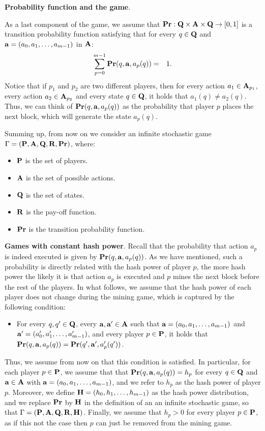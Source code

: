\medskip
\noindent
\textbf{Probability function and the game}.

As a last component of the game, we assume that $\mathbf{Pr} : \mathbf{Q} \times \mathbf{A} \times \mathbf{Q} \to [0,1]$ is a transition probability function satisfying that for every $q \in \mathbf{Q}$ and $\mathbf{a} = (a_0, a_1, \ldots, a_{m-1})$ in $\mathbf{A}$:
\begin{eqnarray*}\label{eq-prop}
\sum_{p=0}^{m-1} \mathbf{Pr}(q, \mathbf{a}, a_p(q)) & = & 1.
\end{eqnarray*}
Notice that if $p_1$ and $p_2$ are two different players, then for every action $a_1 \in \mathbf{A}_{p_1}$, every action $a_2 \in \mathbf{A}_{p_2}$ and every state $q \in \mathbf{Q}$, it holds that $a_1(q) \neq a_2(q)$. Thus, we can think of $\mathbf{Pr}(q, \mathbf{a}, a_p(q))$ as the probability that player $p$ places the next block, which will generate the state $a_p(q)$. 

Summing up, from now on we consider an infinite stochastic game $\Gamma = (\mathbf{P},\mathbf{A},\mathbf{Q},\mathbf{R},\mathbf{Pr})$, where:
\begin{itemize}
	\item $\mathbf{P}$ is the set of players.
	\item $\mathbf{A}$ is the set of possible actions.
	\item $\mathbf{Q}$ is the set of states.
	\item $\mathbf{R}$ is the pay-off function.
	\item $\mathbf{Pr}$ is the transition probability function.
\end{itemize} 

\medskip
\noindent
\textbf{Games with constant hash power}.
Recall that the probability that action $a_p$ is indeed executed is given by $\mathbf{Pr}(q, \mathbf{a}, a_p(q))$. As we have mentioned, such a probability is directly related with the hash power of player $p$, the more hash power the likely it is that action $a_p$ is executed and $p$ mines the next block before the rest of the players. In what follows, we assume that the hash power of each player does not change during the mining game, which is captured by the following condition:
\begin{itemize}
\item For every $q, q' \in \mathbf{Q}$, every $\mathbf{a}, \mathbf{a}' \in \mathbf{A}$ such that $\mathbf{a} = (a_0, a_1, \ldots, a_{m-1})$ and $\mathbf{a}' = (a'_0, a'_1, \ldots, a'_{m-1})$,  and every player $p \in \mathbf{P}$, it holds that $\mathbf{Pr}(q, \mathbf{a}, a_p(q)) = \mathbf{Pr}(q', \mathbf{a}', a'_p(q'))$.
\end{itemize}
Thus, we assume from now on that this condition is satisfied. In particular, for each player $p \in \mathbf{P}$, we assume that that 
$\mathbf{Pr}(q, \mathbf{a}, a_p(q)) = h_p$ for every $q \in \mathbf{Q}$ and $\mathbf{a} \in \mathbf{A}$ with $\mathbf{a} = (a_0, a_1, \ldots, a_{m-1})$, and we refer to $h_p$ as the hash power of player $p$. Moreover, we define $\mathbf{H} = (h_0, h_1, \ldots, h_{m-1})$ as the hash power distribution, and we replace $\mathbf{Pr}$ by $\mathbf{H}$ in the definition of an an infinite stochastic game, so that $\Gamma = (\mathbf{P},\mathbf{A},\mathbf{Q},\mathbf{R},\mathbf{H})$. Finally, we assume that $h_p > 0$ for every player $p \in \mathbf{P}$, as if this not the case then $p$ can just be removed from the mining game. 

